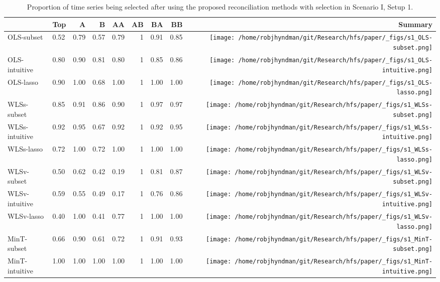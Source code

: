 \documentclass[
  12pt,
  11pt]{article}
\begin{document}
\hypertarget{tbl-s1-selection}{}
\begin{table}[!h]
\caption{\label{tbl-s1-selection}Proportion of time series being selected after using the proposed
reconciliation methods with selection in Scenario I, Setup 1. }\tabularnewline

\centering\begingroup\fontsize{11}{13}\selectfont

\begin{threeparttable}
\begin{tabular}{llrrrrrr>{}r}
\toprule
  & Top & A & B & AA & AB & BA & BB & Summary\\
\midrule
OLS-subset & 0.52 & 0.79 & 0.57 & 0.79 & 1 & 0.91 & 0.85 & \texttt{[image: /home/robjhyndman/git/Research/hfs/paper/\_figs/s1\_OLS-subset.png]}\\
OLS-intuitive & 0.80 & 0.90 & 0.81 & 0.80 & 1 & 0.85 & 0.86 & \texttt{[image: /home/robjhyndman/git/Research/hfs/paper/\_figs/s1\_OLS-intuitive.png]}\\
OLS-lasso & 0.90 & 1.00 & 0.68 & 1.00 & 1 & 1.00 & 1.00 & \texttt{[image: /home/robjhyndman/git/Research/hfs/paper/\_figs/s1\_OLS-lasso.png]}\\
\midrule
WLSs-subset & 0.85 & 0.91 & 0.86 & 0.90 & 1 & 0.97 & 0.97 & \texttt{[image: /home/robjhyndman/git/Research/hfs/paper/\_figs/s1\_WLSs-subset.png]}\\
WLSs-intuitive & 0.92 & 0.95 & 0.67 & 0.92 & 1 & 0.92 & 0.95 & \texttt{[image: /home/robjhyndman/git/Research/hfs/paper/\_figs/s1\_WLSs-intuitive.png]}\\
WLSs-lasso & 0.72 & 1.00 & 0.72 & 1.00 & 1 & 1.00 & 1.00 & \texttt{[image: /home/robjhyndman/git/Research/hfs/paper/\_figs/s1\_WLSs-lasso.png]}\\
\midrule
WLSv-subset & 0.50 & 0.62 & 0.42 & 0.19 & 1 & 0.81 & 0.87 & \texttt{[image: /home/robjhyndman/git/Research/hfs/paper/\_figs/s1\_WLSv-subset.png]}\\
WLSv-intuitive & 0.59 & 0.55 & 0.49 & 0.17 & 1 & 0.76 & 0.86 & \texttt{[image: /home/robjhyndman/git/Research/hfs/paper/\_figs/s1\_WLSv-intuitive.png]}\\
WLSv-lasso & 0.40 & 1.00 & 0.41 & 0.77 & 1 & 1.00 & 1.00 & \texttt{[image: /home/robjhyndman/git/Research/hfs/paper/\_figs/s1\_WLSv-lasso.png]}\\
\midrule
MinT-subset & 0.66 & 0.90 & 0.61 & 0.72 & 1 & 0.91 & 0.93 & \texttt{[image: /home/robjhyndman/git/Research/hfs/paper/\_figs/s1\_MinT-subset.png]}\\
MinT-intuitive & 1.00 & 1.00 & 1.00 & 1.00 & 1 & 1.00 & 1.00 & \texttt{[image: /home/robjhyndman/git/Research/hfs/paper/\_figs/s1\_MinT-intuitive.png]}\\

\end{tabular}
\end{threeparttable}
\end{table}
\end{document}
